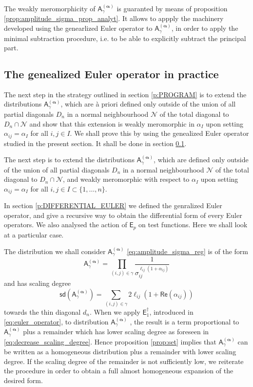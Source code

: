 \documentclass[11pt]{book}
\newcommand{\sd}{\mathsf{sd}}
\renewcommand{\Re}{\mathsf{Re}}
\newcommand{\alphabd}{\boldsymbol{\alpha}}
\newcommand{\Ncal}{\mathcal{N}}
\newcommand{\Asf}{\mathsf{A}}
\newcommand{\Esf}{\mathsf{E}}
\theoremstyle{break}
\begin{document}
The weakly meromorphicity of $\Asf_\gamma^{(\alphabd)}$ is guaranted by means of proposition \ref{prop:amplitude_sigma_prop_analyt}. It allows to appply the machinery developed using the genearlized Euler operator to $\Asf_\gamma^{(\alphabd)}$, in order to apply the minimal subtraction procedure, i.e. to be able to explicitly subtract the principal part.


\subsection{The genealized Euler operator in practice}
\label{p:EULER_OP_PRACTICE}


The next step in the strategy outlined in section \ref{p:PROGRAM} is to extend the distributions $\Asf^{(\alphabd)}_\gamma$, which are à priori defined only outside of the union of all partial diagonals $D_n$ in a normal neighbourhood $\Ncal$ of the total diagonal to $D_n \cap \Ncal$ and show that this extension is weakly meromorphic in $\alpha_I$ upon setting $\alpha_{ij}=\alpha_I$ for all $i,j\in I$. We shall prove this by using the genealized Euler operator studied in the present section. It shall be done in section \ref{p:EULER_OP_PRACTICE}.


The next step is to extend the distributions $\Asf^{(\alphabd)}_\gamma$, which are defined only outside of the union of all partial diagonals $D_n$ in a normal neighbourhood $\Ncal$ of the total diagonal to $D_n \cap \Ncal$, and weakly meromorphic with respect to $\alpha_I$ upon setting $\alpha_{ij}=\alpha_I$ for all $i,j\in I\subset \{1,\ldots,n\}$. 


In section \ref{p:DIFFERENTIAL_EULER} we defined the genralized Euler operator, and give a recursive way to obtain the differential form of every Euler operators. We also analysed the action of $\Esf_p$ on test functions. Here we shall look at a particular case. 


The distribution we shall consider $\Asf^{(\alphabd)}_\gamma$ \eqref{eq:amplitude_sigma_reg} is of the form
%
\begin{equation*}
\Asf_\gamma^{(\alphabd)}=\prod_{(i,j)\in\gamma} \frac{1}{\sigma_{ij}^{\ell_{ij}(1+ \alpha_{ij})}} 
\end{equation*}
%
and has scaling degree 
%
\begin{equation*}
\sd(\Asf_\gamma^{(\alphabd)}) = \sum_{(i,j)\in\gamma} 2 \ell_{ij}\left(1+ \Re(\alpha_{ij})\right) 
\end{equation*}
%
towards the thin diagonal $d_n$. When we apply $\Esf^\dagger_1$, introduced in \eqref{eq:euler_operator}, to distribution $\Asf_\gamma^{(\alphabd)}$ , the result is a term proportional to $\Asf_\gamma^{(\alphabd)}$ plus a remainder which has lower scaling degree as foreseen in \eqref{eq:decrease_scaling_degree}. Hence proposition \ref{prop:set} implies that $\Asf_\gamma^{(\alphabd)}$ can be written as a homogeneous distribution plus a remainder with lower scaling degree. If the scaling degree of the remainder is not sufficiently low, we reiterate the procedure in order to obtain a full almost homogeneous expansion of the desired form.
\end{document}
